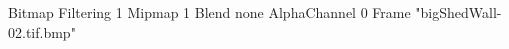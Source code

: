 {Bitmap
	{Filtering 1}
	{Mipmap 1}
	{Blend none}
	{AlphaChannel 0}
	{Frame "bigShedWall-02.tif.bmp"}
}
